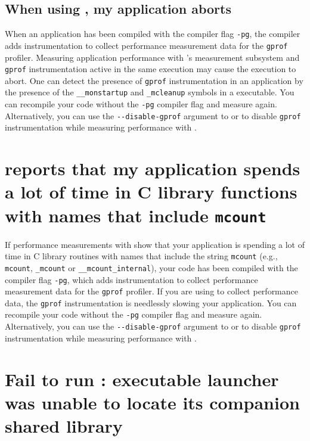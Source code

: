 \documentclass[11pt,letterpaper]{report}
\begin{document}
\subsection{When using \HPCToolkit{}, my application aborts}

When an application has been compiled with the compiler flag \verb|-pg|,
the compiler adds instrumentation to collect performance measurement data for
the \verb|gprof| profiler. Measuring application performance with
\HPCToolkit{}'s measurement subsystem and \verb|gprof| instrumentation
active in the same execution may cause the execution
to abort. One can detect the presence of \verb|gprof| instrumentation in an
application by the presence of the \verb|__monstartup| and \verb|_mcleanup| symbols
in a executable.  You can recompile your code without the
\verb|-pg| compiler flag and measure again. Alternatively, you can use the \verb|--disable-gprof|
argument to \hpcrun{} or \hpclink{} to disable \verb|gprof| instrumentation while 
measuring performance with \HPCToolkit{}.


\section{\HPCToolkit{} reports that my application spends a lot of time in C library functions with names that include {\tt mcount}}

If performance measurements with \HPCToolkit{} show that your
application is spending a lot of time in C library routines with
names that include the string {\tt mcount} (e.g., \verb|mcount|, \verb|_mcount| or
\verb|__mcount_internal|), your code has been compiled with the compiler
flag \verb|-pg|, which adds instrumentation to collect performance
measurement data for the \verb|gprof| profiler.  If you are using
\HPCToolkit{} to collect performance data, the \verb|gprof| instrumentation
is needlessly slowing your application. You can recompile your code without the
\verb|-pg| compiler flag and measure again. Alternatively, you can use the \verb|--disable-gprof|
argument to \hpcrun{} or \hpclink{} to disable \verb|gprof| instrumentation while 
measuring performance with \HPCToolkit{}.



\section{Fail to run \hpcviewer{}: executable launcher was unable to locate its companion shared library}
\end{document}
